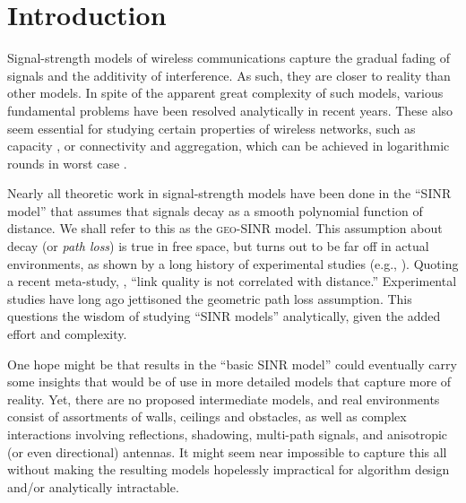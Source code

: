 \documentclass[11pt]{amsart}
\newcommand{\geomodel}{\textsc{geo-SINR}}
\begin{document}
\section{Introduction}
\label{sec:intro}

Signal-strength models of wireless communications capture the gradual
fading of signals and the additivity of interference. As such, they
are closer to reality than other models. In spite of the apparent
great complexity of such models, various fundamental problems have
been resolved analytically in recent years. These also seem essential for
studying certain properties of wireless networks, such as capacity
\cite{kumar00}, or connectivity and aggregation, which can be achieved
in logarithmic rounds in worst case \cite{MoWa06,SODA12}.

Nearly all theoretic work in signal-strength models have been done in
the ``SINR model'' that assumes that signals decay as a smooth
polynomial function of distance. We shall refer to this as the
{\geomodel} model. This assumption about decay (or \emph{path loss})
is true in free space, but turns out to be far off in actual
environments, as shown by a long history of experimental studies
(e.g., \cite{kotz2004experimental}). Quoting a recent meta-study,
\cite{baccour2012radio}, ``link quality is not correlated with distance.'' 
Experimental studies have long ago jettisoned the geometric path loss
assumption. 
This questions the wisdom of studying ``SINR models'' analytically, given the added
effort and complexity.

One hope might be that results in the ``basic SINR model'' could
eventually carry some insights that would be of use in more detailed
models that capture more of reality. Yet, there are no proposed
intermediate models, and real environments consist of 
assortments of walls, ceilings and obstacles,
as well as complex interactions involving reflections, shadowing, 
multi-path signals, and anisotropic (or even directional) antennas.
It might seem near impossible to capture this all without 
making the resulting models hopelessly impractical for algorithm
design and/or analytically intractable. 

\iffalse
\textbf{Intro}
\begin{itemize}
\item Signal-strength (SS) wireless models: Recent results; theoretically allow efficient scheduling/capacity/aggregation; more realistic (capture additivity and fading). 
\item Geometric decay: The Achilles heel of SS-models. Known to be problematic; theoreticians hope that the simplified models yield intrinsic understanding. 
\item Capturing realistic environments: Walls, indoor, outdoor,
  antennas, fading, anything. Directional antennas. 
Experimental: Moved away from prescriptive models
The other parts of the SINR model match well experimentally.
\item Challenge to theory: Extend the models without complicating them; 
 generality, avoid reinventing; 
Good models: faithful, general, analyzable, algorithmic.
(Chasm between experimental and analytic wireless research)
\end{itemize}
\fi
\end{document}
